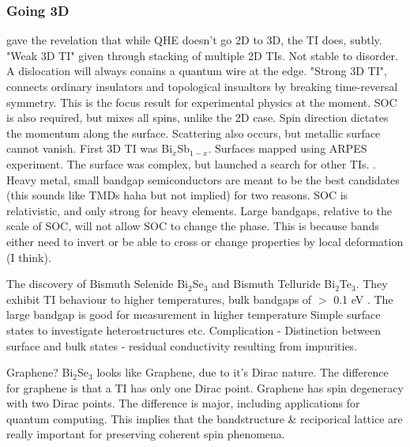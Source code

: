 \documentclass{article} %
\newcommand{\bismuthselinide}[1]{Bi$_2$Se$_3$#1}
\begin{document}
\subsubsection{Going 3D}
\begin{outline}
	 gave the revelation that while QHE doesn't go 2D to 3D, the TI does, subtly. \cite{fu_topological_2007, moore_topological_2007, roy_topological_2009}
	\1 "Weak 3D TI" given through stacking of multiple 2D TIs. Not stable to disorder. A dislocation will always conains a quantum wire at the edge.
	\1 "Strong 3D TI", connects ordinary insulators and topological insualtors by breaking time-reversal symmetry. \cite{moore_topological_2007} This is the focus result for experimental physics at the moment.
	\1 SOC is also required, but mixes all spins, unlike the 2D case. Spin direction dictates the momentum along the surface. Scattering also occurs, but metallic surface cannot vanish.
	\1 First 3D TI was Bi$_x$Sb$_{1-x}$. Surfaces mapped using ARPES experiment. The surface was complex, but launched a search for other TIs. \cite{hsieh_topological_2008,hsieh_observation_2009}.
	\1 Heavy metal, small bandgap semiconductors are meant to be the best candidates (this sounds like TMDs haha but not implied) for two reasons.
		\2 SOC is relativistic, and only strong for heavy elements.
		\2 Large bandgaps, relative to the scale of SOC, will not allow SOC to change the phase. This is because bands either need to invert or be able to cross or change properties by local deformation (I think).
	
	\1 The discovery of Bismuth Selenide Bi$_2$Se$_3$ and Bismuth Telluride Bi$_2$Te$_3$. They exhibit TI behaviour to higher temperatures, bulk bandgaps of $>$ 0.1 eV \cite{xia_observation_2009,zhang_topological_2009,chen_experimental_2009}.
 		\2 The large bandgap is good for measurement in higher temperature
 		\2 Simple surface states to investigate heterostructures etc. 
 		\2 Complication - Distinction between surface and bulk states - residual conductivity resulting from impurities.
	
	\1 Graphene? \bismuthselinide{} looks like Graphene, due to it's Dirac nature. The difference for graphene is that a TI has only one Dirac point. Graphene has spin degeneracy with two Dirac points. The difference is major, including applications for quantum computing. This implies that the bandstructure \& reciporical lattice are really important for preserving coherent spin phenomena.
	

\end{outline}
\end{document}
